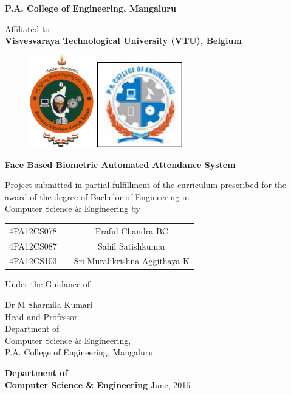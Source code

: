 
\begin{titlingpage}
\thispagestyle{empty}\centering

\setlength{\toptafiddle}{1in}
\setlength{\bottafiddle}{1in}
\vspace*{-0.75in}
\enlargethispage{\toptafiddle}
\large 
\textbf{P.A. College of Engineering, Mangaluru}

Affiliated to\\
\textbf{Visvesvaraya Technological University (VTU), Belgium}\\
\vspace{0.2cm}
\begin{figure}[h]
\centering
\includegraphics[height=4cm]{images/vtu.png}
\hspace{0.1\textwidth}
\includegraphics[height=3.7cm]{images/pace.jpg}
\end{figure}
\vfill
\Huge{\textbf{Face Based Biometric Automated Attendance System}}
\vfill

\large Project submitted in partial fulfillment of the curriculum
prescribed for the award of the degree of Bachelor of Engineering
in \\Computer Science \& Engineering by\vfill


\begin{tabular}{ccc}
4PA12CS078 &  & Praful Chandra BC\\
4PA12CS087 &  & Sahil Satishkumar\\
4PA12CS103 &  & Sri Muralikrishna Aggithaya K\\
\end{tabular}
\vfill
Under the Guidance of\vfill


Dr M Sharmila Kumari\\
Head and Professor\\
Department of \\Computer Science \& Engineering,\\
P.A. College of Engineering, Mangaluru
\vfill

\textbf{Department of \\Computer Science \& Engineering}
\vfill
 June, 2016\\
\end{titlingpage}
%